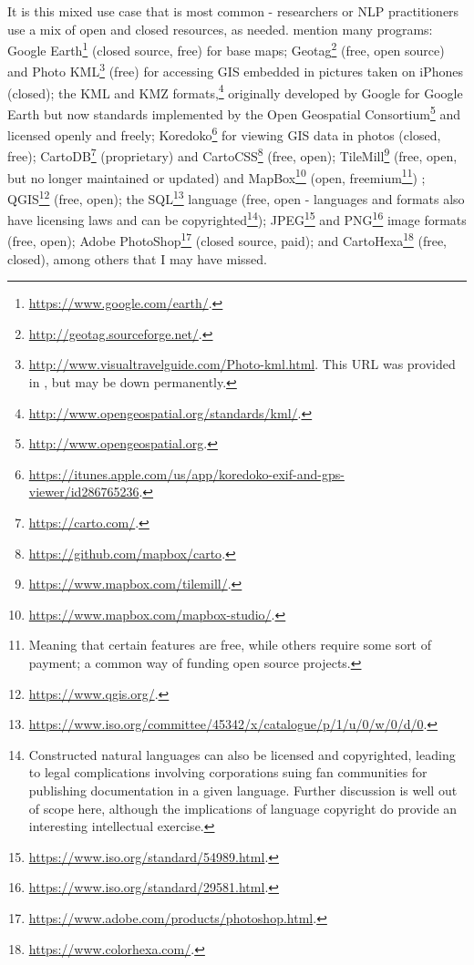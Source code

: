 It is this mixed use case that is most common - researchers or NLP practitioners use a mix of open and closed resources, as needed. \citet{gawne2016mapmaking} mention many programs: Google Earth\footnote{\href{https://www.google.com/earth/}{https://www.google.com/earth/}. } (closed source, free) for base maps; Geotag\footnote{\href{http://geotag.sourceforge.net/}{http://geotag.sourceforge.net/}. } (free, open source) and Photo KML\footnote{\href{http://www.visualtravelguide.com/Photo-kml.html}{http://www.visualtravelguide.com/Photo-kml.html}. This URL was provided in \citet{gawne2016mapmaking}, but may be down permanently.} (free) for accessing GIS embedded in pictures taken on iPhones (closed); the KML and KMZ formats,\footnote{\href{http://www.opengeospatial.org/standards/kml/}{http://www.opengeospatial.org/standards/kml/}. } originally developed by Google for Google Earth but now standards implemented by the Open Geospatial Consortium\footnote{\href{http://www.opengeospatial.org}{http://www.opengeospatial.org}. } and licensed openly and freely; Koredoko\footnote{\href{https://itunes.apple.com/us/app/koredoko-exif-and-gps-viewer/id286765236}{https://itunes.apple.com/us/app/koredoko-exif-and-gps-viewer/id286765236}. } for viewing GIS data in photos (closed, free); CartoDB\footnote{\href{https://carto.com/}{https://carto.com/}. } (proprietary) and CartoCSS\footnote{\href{https://github.com/mapbox/carto}{https://github.com/mapbox/carto}. } (free, open); TileMill\footnote{\href{https://www.mapbox.com/tilemill/}{https://www.mapbox.com/tilemill/}. } (free, open, but no longer maintained or updated) and MapBox\footnote{\href{https://www.mapbox.com/mapbox-studio/}{https://www.mapbox.com/mapbox-studio/}. } (open, freemium\footnote{Meaning that certain features are free, while others require some sort of payment; a common way of funding open source projects.}) ; QGIS\footnote{\href{https://www.qgis.org/}{https://www.qgis.org/}. } (free, open); the SQL\footnote{\href{https://www.iso.org/committee/45342/x/catalogue/p/1/u/0/w/0/d/0}{https://www.iso.org/committee/45342/x/catalogue/p/1/u/0/w/0/d/0}. } language (free, open - languages and formats also have licensing laws and can be copyrighted\footnote{Constructed natural languages can also be licensed and copyrighted, leading to legal complications involving corporations suing fan communities for publishing documentation in a given language. Further discussion is well out of scope here, although the implications of language copyright do provide an interesting intellectual exercise.}); %
JPEG\footnote{\href{https://www.iso.org/standard/54989.html}{https://www.iso.org/standard/54989.html}. } and PNG\footnote{\href{https://www.iso.org/standard/29581.html}{https://www.iso.org/standard/29581.html}. } image formats (free, open); Adobe PhotoShop\footnote{\href{https://www.adobe.com/products/photoshop.html}{https://www.adobe.com/products/photoshop.html}. } (closed source, paid); and CartoHexa\footnote{\href{https://www.colorhexa.com/}{https://www.colorhexa.com/}. } (free, closed), among others that I may have missed.

